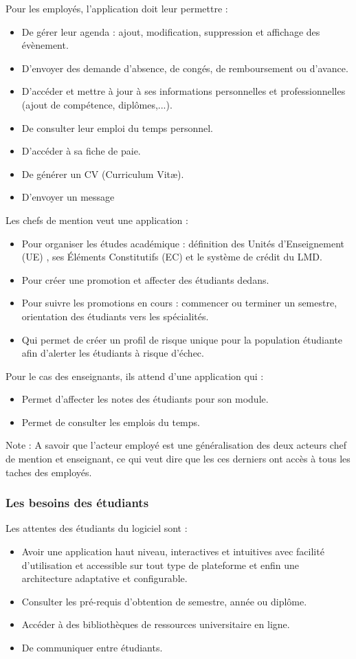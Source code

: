 Pour les employés, l'application doit leur permettre : 
\begin{itemize}
	\item De gérer leur agenda : ajout, modification, suppression et affichage des évènement.
	\item D'envoyer des demande d'absence, de congés, de remboursement ou d'avance.
	\item D'accéder et mettre à jour à ses informations personnelles et professionnelles (ajout de compétence, diplômes,...).
	\item De consulter leur emploi du temps personnel. 
	\item D'accéder à sa fiche de paie.
	\item De générer un CV (Curriculum Vitæ).
	\item D'envoyer un message
\end{itemize}
\medskip

Les chefs de mention veut une application :
\begin{itemize}
	\item Pour organiser les études académique : définition des Unités d'Enseignement (UE) , ses Éléments Constitutifs (EC) et le système de crédit du LMD. 
	\item Pour créer une promotion et affecter des étudiants dedans.
	\item Pour suivre les promotions en cours : commencer ou terminer un semestre, orientation des étudiants vers les spécialités.
	\item Qui permet de créer un profil de risque unique pour la population étudiante afin d'alerter les étudiants à risque d'échec.
\end{itemize}
\medskip

Pour le cas des enseignants, ils attend d'une application qui : 
\begin{itemize}
	\item Permet d'affecter les notes des étudiants pour son module.
	\item Permet de consulter les emplois du temps.
\end{itemize}
\medskip

Note : A savoir que l'acteur employé est une généralisation des deux acteurs chef de mention et enseignant, ce qui veut dire que les ces derniers ont accès à tous les taches des employés.

\subsubsection{Les besoins des étudiants}
Les attentes des étudiants du logiciel sont : 
\begin{itemize}
	\item Avoir une application haut niveau, interactives et intuitives avec facilité d'utilisation et accessible sur tout type de plateforme et enfin une architecture adaptative et configurable.
	\item Consulter les pré-requis d'obtention de semestre, année ou diplôme.
	\item Accéder à des bibliothèques de ressources universitaire en ligne.
	\item De communiquer entre étudiants.
\end{itemize}

